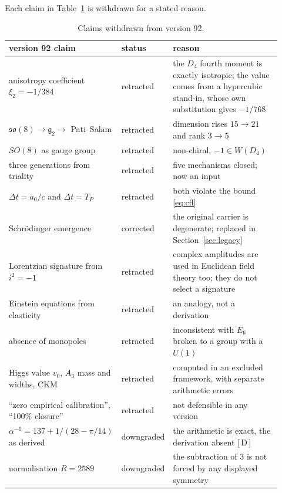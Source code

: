 \documentclass[a4paper,11pt]{article}
\newcommand{\sttag}[3]{{\setlength{\fboxsep}{1.2pt}\colorbox{#1}{\textcolor{#2}{\footnotesize #3}}}}
\newcommand{\strefuted}[1]{\sttag{falsebg}{falsetext}{#1}}
\newcommand{\stneutral}[1]{\sttag{badgebg}{badgetext}{#1}}
\let\jsOldToprule\toprule
\renewcommand{\toprule}{\jsOldToprule\rowcolor{bgheader}}
\numberwithin{equation}{section}
\theoremstyle{jsplain}
\theoremstyle{jsrem}
\newcommand{\grade}[1]{[\,#1\,]}
\begin{document}
Each claim in Table~\ref{tab:retract} is withdrawn for a stated reason.

\begin{table}[htbp]
\centering
\small
\begin{tabular}{p{0.33\linewidth}p{0.15\linewidth}p{0.44\linewidth}}
\toprule
version 92 claim & status & reason\\
\midrule
anisotropy coefficient $\xi_2=-1/384$ & \strefuted{retracted} & the $D_4$ fourth moment is exactly isotropic; the value comes from a hypercubic stand-in, whose own substitution gives $-1/768$\\
$\mathfrak{so}(8)\to\mathfrak{g}_2\to$ Pati--Salam & \strefuted{retracted} & dimension rises $15\to21$ and rank $3\to5$\\
$SO(8)$ as gauge group & \strefuted{retracted} & non-chiral, $-1\in W(D_4)$\\
three generations from triality & \strefuted{retracted} & five mechanisms closed; now an input\\
$\Delta t=a_0/c$ and $\Delta t=T_P$ & \strefuted{retracted} & both violate the bound \eqref{eq:cfl}\\
Schrödinger emergence & \stneutral{corrected} & the original carrier is degenerate; replaced in Section~\ref{sec:legacy}\\
Lorentzian signature from $i^2=-1$ & \strefuted{retracted} & complex amplitudes are used in Euclidean field theory too; they do not select a signature\\
Einstein equations from elasticity & \strefuted{retracted} & an analogy, not a derivation\\
absence of monopoles & \strefuted{retracted} & inconsistent with $E_6$ broken to a group with a $U(1)$\\
Higgs value $v_0$, $A_3$ mass and widths, CKM & \strefuted{retracted} & computed in an excluded framework, with separate arithmetic errors\\
``zero empirical calibration'', ``100\% closure'' & \strefuted{retracted} & not defensible in any version\\
$\alpha^{-1}=137+1/(28-\pi/14)$ as derived & \stneutral{downgraded} & the arithmetic is exact, the derivation absent \grade{D}\\
normalisation $R=2589$ & \stneutral{downgraded} & the subtraction of $3$ is not forced by any displayed symmetry\\
\bottomrule
\end{tabular}
\caption{Claims withdrawn from version 92.}
\label{tab:retract}
\end{table}
\end{document}
